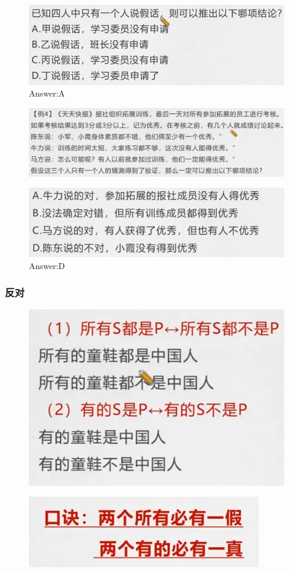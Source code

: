 \documentclass{article}
\numberwithin{equation}{section}						%
\numberwithin{figure}{section}							%
\begin{document}
\begin{sloppypar}
\begin{figure}[H]
     \centering
     \includegraphics[width=0.5\linewidth]{171.png}
		\caption{Answer:A}
\end{figure}


\begin{figure}[H]
     \centering
     \includegraphics[width=0.6\linewidth]{172.png}
\end{figure}


\begin{figure}[H]
     \centering
     \includegraphics[width=0.5\linewidth]{173.png}
		\caption{Answer:D}
\end{figure}


\subsubsection{反对}


\begin{figure}[H]
     \centering
     \includegraphics[width=0.4\linewidth]{174.png}
\end{figure}


\begin{figure}[H]
     \centering
     \includegraphics[width=0.3\linewidth]{175.png}
\end{figure}


\end{sloppypar}
\end{document}
